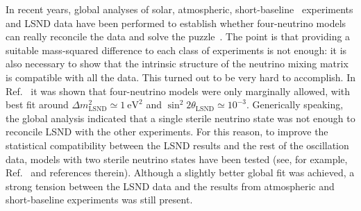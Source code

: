 \documentclass[12pt]{elsart}
\newcommand{\eVq}{\ensuremath{\text{eV}^2}}
\newcommand{\Dmq}{\Delta m^2}
\begin{document}
In recent years, global analyses of solar, atmospheric,
short-baseline~\cite{Kleinfeller:2000em, Dydak:1983zq,
Stockdale:1984ce, Declais:1994su} experiments and LSND data have been
performed to establish whether four-neutrino models can really
reconcile the data and solve the puzzle~\cite{Grimus:2001mn,
Bilenky:1996rw, Okada:1996kw, Barger:1998bn, Bilenky:1999ny,
Peres:2000ic, Giunti:2000ur, Maltoni:2004ei}. The point is that
providing a suitable mass-squared difference to each class of
experiments is not enough: it is also necessary to show that the
intrinsic structure of the neutrino mixing matrix is compatible with
all the data. This turned out to be very hard to accomplish. In
Ref.~\cite{Maltoni:2002xd} it was shown that four-neutrino models were
only marginally allowed, with best fit around $\Dmq_\text{LSND} \simeq
1~\eVq$ and $\sin^2 2 \theta_\text{LSND} \simeq 10^{-3}$. Generically
speaking, the global analysis indicated that a single sterile neutrino
state was not enough to reconcile LSND with the other experiments. For
this reason, to improve the statistical compatibility between the LSND
results and the rest of the oscillation data, models with two sterile
neutrino states have been tested (see, for example,
Ref.~\cite{Sorel:2003hf} and references therein). Although a slightly
better global fit was achieved, a strong tension between the LSND data
and the results from atmospheric and short-baseline experiments was
still present. 
\end{document}
